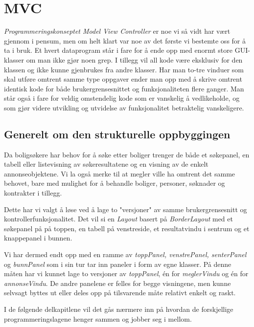 \section{MVC}
\emph{Programmeringskonseptet Model View Controller} er noe vi så vidt har vært gjennom i pensum, men om helt klart var noe av det første vi bestemte oss for å ta i bruk.
Et hvert dataprogram står i fare for å ende opp med enormt store GUI-klasser om man ikke gjør noen grep. I tillegg vil all kode være eksklusiv for den klassen og ikke kunne gjenbrukes fra andre klasser. Har man to-tre vinduer som skal utføre omtrent samme type oppgaver ender man opp med å skrive omtrent identisk kode for både brukergrensesnittet og funksjonaliteten flere ganger.
Man står også i fare for veldig omstendelig kode som er vanskelig å vedlikeholde, og som gjør videre utvikling og utvidelse av funksjonalitet betraktelig vanskeligere.

\subsection{Generelt om den strukturelle oppbyggingen}
Da boligsøkere har behov for å søke etter boliger trenger de både et søkepanel, en tabell eller listevisning av søkeresultatene og en visning av de enkelt annonseobjektene.
Vi la også merke til at megler ville ha omtrent det samme behovet, bare med mulighet for å behandle boliger, personer, søknader og kontrakter i tillegg.

Dette har vi valgt å løse ved å lage to "versjoner" av samme brukergrensesnitt og kontrollerfunksjonalitet.
Det vil si en \emph{Layout} basert på \emph{BorderLayout} med et søkepanel på på toppen, en tabell på venstreside, et resultatvindu i sentrum og et knappepanel i bunnen.

Vi har dermed endt opp med en ramme av \emph{toppPanel, venstrePanel, senterPanel} og \emph{bunnPanel} som i sin tur tar inn paneler i form av egne klasser. På denne måten har vi kunnet lage to versjoner av \emph{toppPanel}, én for \emph{meglerVindu} og én for \emph{annonseVindu}. De andre panelene er felles for begge visningene, men kunne selvsagt byttes ut eller deles opp på tilsvarende måte relativt enkelt og raskt.

I de følgende delkapitlene vil det gås nærmere inn på hvordan de forskjellige programmeringslagene henger sammen og jobber seg i mellom.

